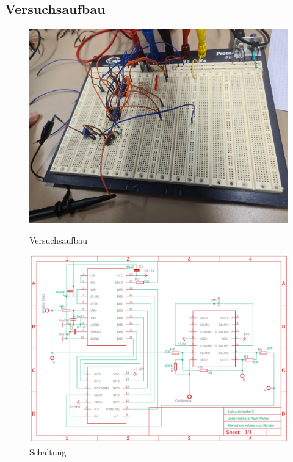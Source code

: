 \documentclass[12pt, a4paper, ngerman]{article}
\begin{document}
\subsection{Versuchsaufbau}

\begin{figure}%
  \centering
  \begin{minipage}[b]{0.49\textwidth} %
    \includegraphics[width=\textwidth]{bild_versuch_3.jpg}
    \caption{Versuchsaufbau}
    \label{abb:aufbau3}
  \end{minipage}
  \hfill
  \begin{minipage}[b]{0.49\textwidth}
    \includegraphics[width=\textwidth]{schaltplan_versuch_3.png}
    \caption{Schaltung}
    \label{abb:schaltung3}
  \end{minipage}
\end{figure}
\end{document}
